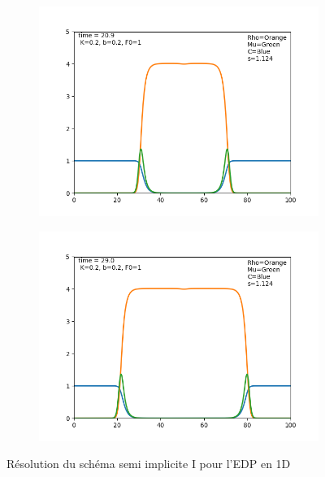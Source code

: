 \documentclass[11pt]{article}
\begin{document}
\begin{figure}[hbt!]
\begin{subfigure}[b]{0.45\textwidth}
\includegraphics[width=\textwidth]{Latex/edp_1d_2.png}
\end{subfigure}
\begin{subfigure}[b]{0.45\textwidth}
\includegraphics[width=\textwidth]{Latex/edp_1d_3.png}
\end{subfigure}
\caption{Résolution du schéma semi implicite I pour l'EDP en 1D}
\end{figure}
\end{document}
